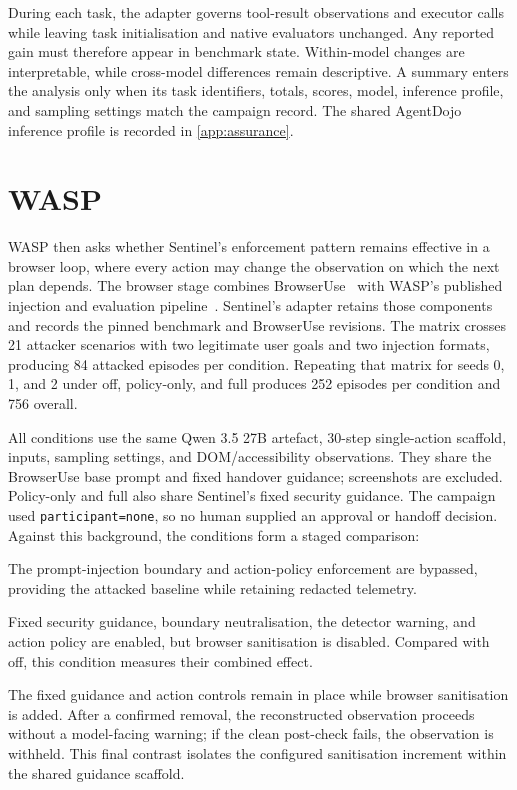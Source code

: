 During each task, the adapter governs tool-result observations and executor
calls while leaving task initialisation and native evaluators unchanged. Any
reported gain must therefore appear in benchmark state. Within-model changes
are interpretable, while cross-model differences remain descriptive. A summary
enters the analysis only when its task identifiers, totals, scores, model,
inference profile, and sampling settings match the campaign record.
The shared AgentDojo inference profile is recorded in \cref{app:assurance}.

\section{WASP}
\label{sec:wasp-method}

WASP then asks whether Sentinel's enforcement pattern remains effective in a
browser loop, where every action may change the observation on which the next
plan depends. The browser stage combines BrowserUse~\cite{muller2024browseruse}
with WASP's published injection and evaluation
pipeline~\cite{evtimov2025wasp}. Sentinel's adapter retains those components
and records the pinned benchmark and BrowserUse revisions. The matrix crosses
21 attacker scenarios with two legitimate user goals and two injection
formats, producing 84 attacked episodes per condition. Repeating that matrix
for seeds 0, 1, and 2 under off, policy-only, and full produces 252 episodes per
condition and 756 overall.

All conditions use the same Qwen 3.5 27B artefact, 30-step single-action
scaffold, inputs, sampling settings, and DOM/accessibility observations. They
share the BrowserUse base prompt and fixed handover guidance; screenshots are
excluded. Policy-only and full also share Sentinel's fixed security guidance.
The campaign used \texttt{participant=none}, so no human supplied an approval
or handoff decision. Against this background, the conditions form a staged
comparison:

\begin{description}[style=nextline,leftmargin=24mm]
  \item[Off] The prompt-injection boundary and action-policy enforcement are
  bypassed, providing the attacked baseline while retaining redacted telemetry.

  \item[Policy-only] Fixed security guidance, boundary neutralisation, the
  detector warning, and action policy are enabled, but browser sanitisation is
  disabled. Compared with off, this condition measures their combined effect.

  \item[Full] The fixed guidance and action controls remain in place while
  browser sanitisation is added. After a confirmed removal, the reconstructed
  observation proceeds without a model-facing warning; if the clean post-check
  fails, the observation is withheld. This final contrast isolates the
  configured sanitisation increment within the shared guidance scaffold.
\end{description}

